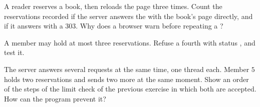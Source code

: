 \begin{exercise}[$\star\star\star$]\label{exo:g10:project-web-application:13}
A reader reserves a book, then reloads the page three times. Count the reservations recorded if the server answers
the  with the book's page directly, and if it answers with a 303. Why does a browser warn before repeating a
?
\end{exercise}

\begin{exercise}[$\star\star\star$]\label{exo:g10:project-web-application:14}
A member may hold at most three reservations. Refuse a fourth with status , and test it.
\end{exercise}

\begin{exercise}[$\star\star\star$]\label{exo:g10:project-web-application:15}
The server answers several requests at the same time, one thread each. Member $5$ holds two reservations and sends
two more at the same moment. Show an order of the steps of the limit check of the previous exercise in which both
are accepted. How can the program prevent it?
\end{exercise}
